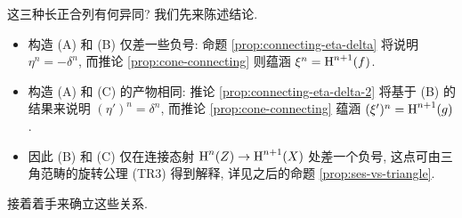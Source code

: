这三种长正合列有何异同? 我们先来陈述结论.

\begin{itemize}
	\item 构造 (A) 和 (B) 仅差一些负号: 命题 \ref{prop:connecting-eta-delta} 将说明 $\eta^n = -\delta^n$, 而推论 \ref{prop:cone-connecting} 则蕴涵 $\xi^n = \operatorname{H}^{n+1}(f)$.
	\item 构造 (A) 和 (C) 的产物相同: 推论 \ref{prop:connecting-eta-delta-2} 将基于 (B) 的结果来说明 $(\eta')^n = \delta^n$, 而推论 \ref{prop:cone-connecting} 蕴涵 $(\xi')^n = \operatorname{H}^{n+1}(g)$.
	\item 因此 (B) 和 (C) 仅在连接态射 $\operatorname{H}^n(Z) \to \operatorname{H}^{n+1}(X)$ 处差一个负号, 这点可由三角范畴的旋转公理 (TR3) 得到解释, 详见之后的命题 \ref{prop:ses-vs-triangle}.
\end{itemize}
接着着手来确立这些关系.

